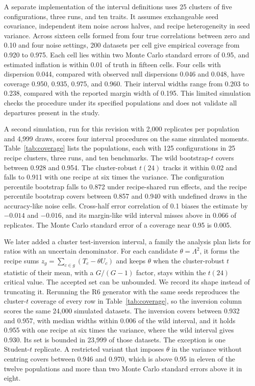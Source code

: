 A separate implementation of the interval definitions uses 25 clusters of five configurations, three runs, and ten traits. It assumes exchangeable seed covariance, independent item noise across halves, and recipe heterogeneity in seed variance. Across sixteen cells formed from four true correlations between zero and 0.10 and four noise settings, 200 datasets per cell give empirical coverage from 0.920 to 0.975. Each cell lies within two Monte Carlo standard errors of 0.95, and estimated inflation is within 0.01 of truth in fifteen cells. Four cells with dispersion 0.044, compared with observed null dispersions 0.046 and 0.048, have coverage 0.950, 0.935, 0.975, and 0.960. Their interval widths range from 0.203 to 0.238, compared with the reported margin width of 0.195. This limited simulation checks the procedure under its specified populations and does not validate all departures present in the study.

A second simulation, run for this revision with 2,000 replicates per population and 4,999 draws, scores four interval procedures on the same simulated moments. Table~\ref{tab:coverage} lists the populations, each with 125 configurations in 25 recipe clusters, three runs, and ten benchmarks. The wild bootstrap-$t$ covers between 0.928 and 0.954. The cluster-robust $t(24)$ tracks it within 0.02 and falls to 0.911 with one recipe at six times the variance. The configuration percentile bootstrap falls to 0.872 under recipe-shared run effects, and the recipe percentile bootstrap covers between 0.857 and 0.940 with undefined draws in the accuracy-like noise cells. Cross-half error correlation of 0.1 biases the estimate by $-0.014$ and $-0.016$, and its margin-like wild interval misses above in 0.066 of replicates. The Monte Carlo standard error of a coverage near 0.95 is 0.005.

We later added a cluster test-inversion interval, a family the analysis plan lists for ratios with an uncertain denominator. For each candidate $\theta=\Lambda^2$, it forms the recipe sums $z_g=\sum_{c\in g}(T_c-\theta U_c)$ and keeps $\theta$ when the cluster-robust $t$ statistic of their mean, with a $G/(G-1)$ factor, stays within the $t(24)$ critical value. The accepted set can be unbounded. We record its shape instead of truncating it. Rerunning the R6 generator with the same seeds reproduces the cluster-$t$ coverage of every row in Table~\ref{tab:coverage}, so the inversion column scores the same 24,000 simulated datasets. The inversion covers between 0.932 and 0.957, with median widths within 0.006 of the wild interval, and it holds 0.955 with one recipe at six times the variance, where the wild interval gives 0.930. Its set is bounded in 23,999 of those datasets. The exception is one Student-$t$ replicate. A restricted variant that imposes $\theta$ in the variance without centring covers between 0.946 and 0.970, which is above 0.95 in eleven of the twelve populations and more than two Monte Carlo standard errors above it in eight.

